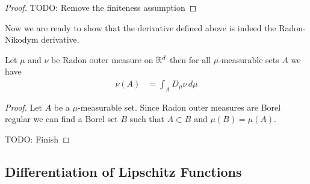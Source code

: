 \begin{proof}
TODO: Remove the finiteness assumption
\end{proof}

Now we are ready to show that the derivative defined above is indeed the Radon-Nikodym derivative.
\begin{thm}\label{RadonNikodymDerivativeOfRadonOuterMeasuresReals}Let $\mu$ and $\nu$ be Radon outer measure on $\mathbb{R}^d$ then for all $\mu$-measurable sets $A$ we have
\begin{align*}
\nu(A) &= \int_A D_\mu \nu \, d\mu
\end{align*}
\end{thm}
\begin{proof}
Let $A$ be a $\mu$-measurable set.  Since Radon outer measures are Borel regular we can find a Borel set $B$ such that $A \subset B$ and $\mu(B) = \mu(A)$.

TODO: Finish
\end{proof}
\subsection{Differentiation of Lipschitz Functions}

